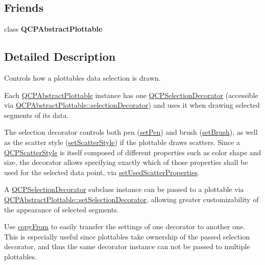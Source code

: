 \subsection*{Friends}
\begin{DoxyCompactItemize}
\item 
\mbox{\label{class_q_c_p_selection_decorator_ab986d82221cf19fcfdc2833494186c03}} 
class {\bfseries Q\+C\+P\+Abstract\+Plottable}
\end{DoxyCompactItemize}


\subsection{Detailed Description}
Controls how a plottable\textquotesingle{}s data selection is drawn. 

Each \hyperlink{class_q_c_p_abstract_plottable}{Q\+C\+P\+Abstract\+Plottable} instance has one \hyperlink{class_q_c_p_selection_decorator}{Q\+C\+P\+Selection\+Decorator} (accessible via \hyperlink{class_q_c_p_abstract_plottable_a7861518e47ca0c6a0c386032c2db075e}{Q\+C\+P\+Abstract\+Plottable\+::selection\+Decorator}) and uses it when drawing selected segments of its data.

The selection decorator controls both pen (\hyperlink{class_q_c_p_selection_decorator_ac2c8192e1e294aa3a4a7f32a859e3d76}{set\+Pen}) and brush (\hyperlink{class_q_c_p_selection_decorator_aa74b626be518ea17055f918d423c8c2d}{set\+Brush}), as well as the scatter style (\hyperlink{class_q_c_p_selection_decorator_ab403a613289714ff4fd4a0c0371ab116}{set\+Scatter\+Style}) if the plottable draws scatters. Since a \hyperlink{class_q_c_p_scatter_style}{Q\+C\+P\+Scatter\+Style} is itself composed of different properties such as color shape and size, the decorator allows specifying exactly which of those properties shall be used for the selected data point, via \hyperlink{class_q_c_p_selection_decorator_a808c1607cd4e83869c04986e332455c0}{set\+Used\+Scatter\+Properties}.

A \hyperlink{class_q_c_p_selection_decorator}{Q\+C\+P\+Selection\+Decorator} subclass instance can be passed to a plottable via \hyperlink{class_q_c_p_abstract_plottable_a20e266ad646f8c4a7e4631040510e5d9}{Q\+C\+P\+Abstract\+Plottable\+::set\+Selection\+Decorator}, allowing greater customizability of the appearance of selected segments.

Use \hyperlink{class_q_c_p_selection_decorator_a467a8d5cfcab27e862a17c797ac27b8a}{copy\+From} to easily transfer the settings of one decorator to another one. This is especially useful since plottables take ownership of the passed selection decorator, and thus the same decorator instance can not be passed to multiple plottables.

